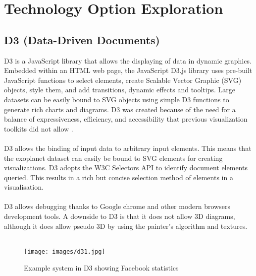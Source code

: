 \documentclass[11pt
              , a4paper
              , twoside
              , openright
              ]{report}
\begin{document}
\section{Technology Option Exploration}

\subsection{D3 (Data-Driven Documents)}
D3 is a JavaScript library that allows the displaying of data in dynamic
graphics. Embedded within an HTML web page, the JavaScript D3.js library uses
pre-built JavaScript functions to select elements, create Scalable Vector
Graphic (SVG)\cite{svg} objects, style them, and add transitions, dynamic
effects and tooltips. Large datasets can be easily bound to SVG objects using
simple D3 functions to generate rich charts and diagrams. D3 was created because
of the need for a balance of expressiveness, efficiency, and accessibility that
previous visualization toolkits did not allow \cite{d3}. 
\\\\
D3 allows the binding of input data to arbitrary input elements. This means that
the exoplanet dataset can easily be bound to SVG elements for creating
visualizations. D3 adopts the W3C Selectors API to identify document elements
queried. This results in a rich but concise selection method of elements in a
visualisation. 
\\\\
D3 allows debugging thanks to Google chrome and other modern browsers
development tools. A downside to D3 is that it does not allow 3D diagrams,
although it does allow pseudo 3D by using the painter's algorithm and textures.
\\\\
\begin{figure}[h!]
  \centering
      \texttt{[image: images/d31.jpg]}
  \caption{Example system in D3 showing Facebook statistics \cite{d3example}}
\end{figure}
\end{document}
